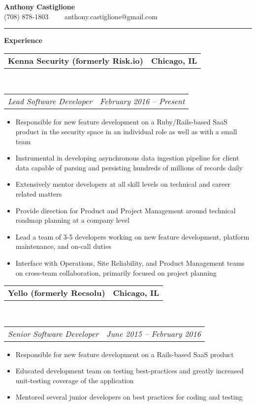\documentclass[10pt,letterpaper]{article}
\makeatletter
\newcommand{\headerrow}[2]
{\begin{tabular*}{\linewidth}{l@{\extracolsep{\fill}}r}
	#1 &
	#2 \\
\end{tabular*}}
\newenvironment{indentsection}[1]%
{\begin{list}{}%
	{\setlength{\leftmargin}{#1}}%
	\item[]%
}
{\end{list}}
\makeatother
\begin{document}
\begin{center}
{\LARGE \textbf {Anthony Castiglione}} \\ (708) 878-1803 \ \ \textbullet \ \ anthony.castiglione@gmail.com
	\end{center}
\hrule
\vspace{0.2in}
{\large \textbf{Experience}}

\begin{indentsection}{\parindent}
	\headerrow
		{\textbf{Kenna Security (formerly Risk.io)} }
		{\textbf{Chicago, IL}}
	\\
	\headerrow
		{\emph{Lead Software Developer}}
		{\emph{February 2016 -- Present}}

	\begin{itemize}
	\renewcommand{\labelitemi}{$-$}
	\vspace{-0.1in}
    \item Responsible for new feature development on a Ruby/Rails-based SaaS product in the security space in an individual role as well as with a small team
    \item Instrumental in developing asynchronous data ingestion pipeline for client data capable of parsing and persisting hundreds of millions of records daily
    \item Extensively mentor developers at all skill levels on technical and career related matters
    \item Provide direction for Product and Project Management around technical roadmap planning at a company level
    \item Lead a team of 3-5 developers working on new feature development, platform maintenance, and on-call duties
    \item Interface with Operations, Site Reliability, and Product Management teams on cross-team collaboration, primarily focused on project planning
	\end{itemize}
\end{indentsection}

\begin{indentsection}{\parindent}
	\headerrow
		{\textbf{Yello (formerly Recsolu)} }
		{\textbf{Chicago, IL}}
	\\
	\headerrow
		{\emph{Senior Software Developer}}
		{\emph{June 2015 -- February 2016}}

	\begin{itemize}
	\renewcommand{\labelitemi}{$-$}
	\vspace{-0.1in}
    \item Responsible for new feature development on a Rails-based SaaS product
    \item Educated development team on testing best-practices and greatly increased unit-testing coverage of the application
    \item Mentored several junior developers on best practices for coding and testing
	\end{itemize}
\end{indentsection}
\end{document}
